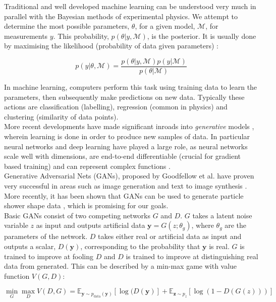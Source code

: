 \documentclass{article}
\begin{document}
Traditional and well developed machine learning can be understood very much in parallel with the Bayesian methods of experimental physics. We attempt to determine the most possible parameters, $\theta$, for a given model, $\mathcal{M}$, for measurements $y$. This probability, $p(\theta|y, \mathcal{M})$, is the posterior. It is usually done by maximising the likelihood (probability of data given parameters) \cite{data}:

\[
p(y|\theta, \mathcal{M}) = \frac{p(\theta|y, \mathcal{M})p(y|\mathcal{M})}{p(\theta|\mathcal{M})}
\]

In machine learning, computers perform this task using training data to learn the parameters, then subsequently make predictions on new data. Typically these actions are classification (labelling), regression (common in physics) and clustering (similarity of data points). \\

More recent developments have made significant inroads into \textit{generative} models \cite{deepgentalk}, wherein learning is done in order to produce new samples of data. In particular neural networks and deep learning have played a large role, as neural networks scale well with dimensions, are end-to-end differentiable (crucial for gradient based training) and can represent complex functions \cite{deepgentalk}.\\

Generative Adversarial Nets (GANs), proposed by Goodfellow et al. \cite{gan1} have proven very successful in areas such as image generation and text to image synthesis \cites{Radford2015}{text2im}. More recently, it has been shown that GANs can be used to generate particle shower shape data \cite{louppe}, which is promising for our goals. \\

Basic GANs consist of two competing networks $G$ and $D$. $G$ takes a latent noise variable $z$ as input and outputs artificial data $\mathbf{y} = G(z;\theta_g)$, where $\theta_g$ are the parameters of the network. $D$ takes either real or artificial data as input and outputs a scalar, $D(\mathbf{y})$, corresponding to the probability that $\mathbf{y}$ is real. $G$ is trained to improve at fooling $D$ and $D$ is trained to improve at distinguishing real data from generated. This can be described by a min-max game with value function $V(G,D)$:

\begin{equation}
	\label{eq:minmax}
	\min_{G}\max_{D}V(D,G) = \mathbb{E}_{\mathbf{y}\sim p_{\text{data}}(\mathbf{y})} [\log(D(\mathbf{y})] + \mathbb{E}_{\mathbf{z}\sim p_{z}} [\log(1-D(G(z)))] 
\end{equation} 
\end{document}
